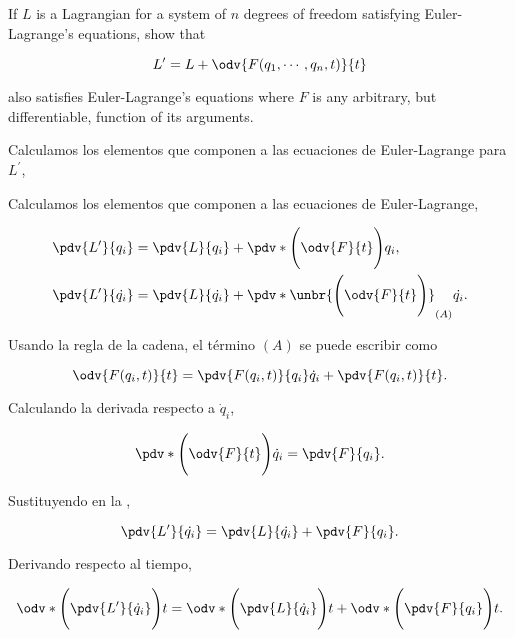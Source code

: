 \documentclass[../main.tex]{subfiles}
\begin{document}
\begin{problema}
	If \(L\) is a Lagrangian for a system of \(n\) degrees of freedom satisfying
	Euler-Lagrange's equations, show that

	\begin{equation*}
		L^{\prime} = L + \odv{F(q_{1}, \cdots, q_{n}, t)}{t}
	\end{equation*}

	also satisfies Euler-Lagrange's equations where \(F\) is any arbitrary,
	but differentiable, function of its arguments.

	\startsolution

	Calculamos los elementos que componen a las ecuaciones de
	Euler-Lagrange para \(L^{\prime}\),

	Calculamos los elementos que componen a las ecuaciones de
	Euler-Lagrange,

	\begin{align}
		\pdv{L^{\prime}}{q_{i}}       & = \pdv{L}{q_{i}} + \pdv*{\Biggl(\odv{F}{t}\Biggr)}{q_{i}}\label{eq:second-term-L},                         \\
		\pdv{L^{\prime}}{\dot{q_{i}}} & = \pdv{L}{\dot{q_{i}}} + \pdv*{\unbr{\Biggl(\odv{F}{t}\Biggr)}_{(A)}}{\dot{q_{i}}}.\label{eq:first-term-L}
	\end{align}

	Usando la regla de la cadena, el término \((A)\) se puede escribir como

	\begin{equation*}
		\odv{F(q_{i}, t)}{t} = \pdv{F(q_{i}, t)}{q_{i}}\dot{q}_{i} + \pdv{F(q_{i}, t)}{t}.
	\end{equation*}

	Calculando la derivada respecto a \(\dot{q}_{i}\),

	\begin{equation*}
		\pdv*{\Biggl(\odv{F}{t}\Biggr)}{\dot{q}_{i}} = \pdv{F}{q_{i}}.
	\end{equation*}

	Sustituyendo en la ,

	\begin{equation*}
		\pdv{L^{\prime}}{\dot{q_{i}}}  = \pdv{L}{\dot{q_{i}}} + \pdv{F}{q_{i}}.
	\end{equation*}

	Derivando respecto al tiempo,

	\begin{equation*}
		\odv*{\Biggl(\pdv{L^{\prime}}{\dot{q}_{i}}\Biggr)}{t} = \odv*{\Biggl(\pdv{L}{\dot{q}_{i}}\Biggr)}{t} + \odv*{\Biggl(\pdv{F}{q_{i}}\Biggr)}{t}.
	\end{equation*}


\end{problema}
\end{document}
